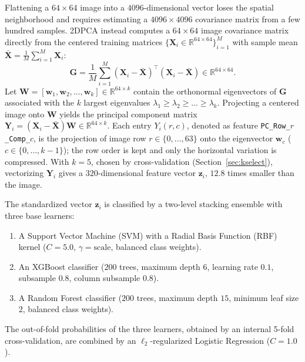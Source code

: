 Flattening a $64 \times 64$ image into a $4096$-dimensional vector loses the spatial neighborhood and requires estimating a $4096 \times 4096$ covariance matrix from a few hundred samples. 2DPCA \cite{yang2004two} instead computes a $64 \times 64$ image covariance matrix directly from the centered training matrices $\{\mathbf{X}_i \in \mathbb{R}^{64 \times 64}\}_{i=1}^{M}$ with sample mean $\bar{\mathbf{X}} = \frac{1}{M}\sum_{i=1}^{M} \mathbf{X}_i$:
\begin{equation}\label{eq:2dpca_cov}
    \mathbf{G} = \frac{1}{M}\sum_{i=1}^{M} (\mathbf{X}_i - \bar{\mathbf{X}})^\top (\mathbf{X}_i - \bar{\mathbf{X}}) \in \mathbb{R}^{64 \times 64}.
\end{equation}
Let $\mathbf{W} = [\mathbf{w}_1, \mathbf{w}_2, \dots, \mathbf{w}_k] \in \mathbb{R}^{64 \times k}$ contain the orthonormal eigenvectors of $\mathbf{G}$ associated with the $k$ largest eigenvalues $\lambda_1 \ge \lambda_2 \ge \dots \ge \lambda_k$. Projecting a centered image onto $\mathbf{W}$ yields the principal component matrix $\mathbf{Y}_i = (\mathbf{X}_i - \bar{\mathbf{X}})\mathbf{W} \in \mathbb{R}^{64 \times k}$. Each entry $Y_i(r, c)$, denoted as feature \texttt{PC\_Row\_$r$\_Comp\_$c$}, is the projection of image row $r \in \{0, \dots, 63\}$ onto the eigenvector $\mathbf{w}_c$ ($c \in \{0, \dots, k-1\}$); the row order is kept and only the horizontal variation is compressed. With $k=5$, chosen by cross-validation (Section~\ref{sec:kselect}), vectorizing $\mathbf{Y}_i$ gives a $320$-dimensional feature vector $\mathbf{z}_i$, $12.8$ times smaller than the image.

The standardized vector $\mathbf{z}_i$ is classified by a two-level stacking ensemble \cite{wolpert1992stacked} with three base learners:
\begin{enumerate}
    \item A Support Vector Machine (SVM) with a Radial Basis Function (RBF) kernel ($C = 5.0$, $\gamma = \text{scale}$, balanced class weights).
    \item An XGBoost classifier ($200$ trees, maximum depth $6$, learning rate $0.1$, subsample $0.8$, column subsample $0.8$).
    \item A Random Forest classifier ($200$ trees, maximum depth $15$, minimum leaf size $2$, balanced class weights).
\end{enumerate}
The out-of-fold probabilities of the three learners, obtained by an internal 5-fold cross-validation, are combined by an $\ell_2$-regularized Logistic Regression ($C = 1.0$).

